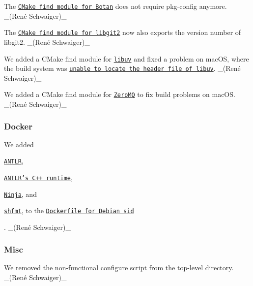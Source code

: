 \begin{DoxyItemize}
\item The \href{https://master.libelektra.org/cmake/Modules/FindLibgcrypt.cmake}{\tt C\+Make find module for Botan} does not require {\ttfamily pkg-\/config} anymore. \+\_\+(René Schwaiger)\+\_\+
\item The \href{https://master.libelektra.org/cmake/Modules/FindLibGit2.cmake}{\tt C\+Make find module for libgit2} now also exports the version number of libgit2. \+\_\+(René Schwaiger)\+\_\+
\item We added a C\+Make find module for \href{https://libuv.org}{\tt libuv} and fixed a problem on mac\+OS, where the build system was \href{https://cirrus-ci.com/task/4852008365326336}{\tt unable to locate the header file of libuv}. \+\_\+(René Schwaiger)\+\_\+
\item We added a C\+Make find module for \href{http://zeromq.org}{\tt Zero\+MQ} to fix build problems on mac\+OS. \+\_\+(René Schwaiger)\+\_\+
\end{DoxyItemize}

\subsubsection*{Docker}


\begin{DoxyItemize}
\item We added
\begin{DoxyItemize}
\item \href{https://packages.debian.org/sid/antlr4}{\tt A\+N\+T\+LR},
\item \href{https://packages.debian.org/sid/libantlr4-runtime-dev}{\tt A\+N\+T\+L\+R’s C++ runtime},
\item \href{https://packages.debian.org/sid/ninja-build}{\tt Ninja}, and
\item \href{https://github.com/mvdan/sh}{\tt {\ttfamily shfmt}}, to the \href{https://master.libelektra.org/scripts/docker/debian/sid/Dockerfile}{\tt Dockerfile for Debian sid}
\end{DoxyItemize}

. \+\_\+(René Schwaiger)\+\_\+
\end{DoxyItemize}

\subsubsection*{Misc}


\begin{DoxyItemize}
\item We removed the non-\/functional {\ttfamily configure} script from the top-\/level directory. \+\_\+(René Schwaiger)\+\_\+
\end{DoxyItemize}

